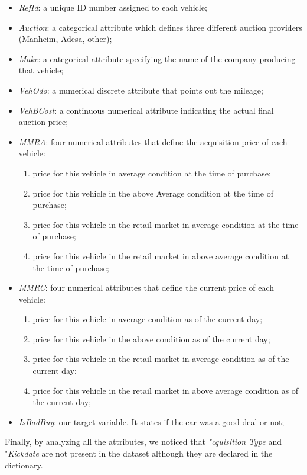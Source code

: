 \documentclass{article}
\begin{document}
	\begin{itemize}
		\item \emph{RefId}: a unique ID number assigned to each vehicle;
		\item \emph{Auction}: a categorical attribute which defines three different auction providers (Manheim, Adesa, other);
		\item \emph{Make}: a categorical attribute specifying the name of the company producing that vehicle;
		\item \emph{VehOdo}: a numerical discrete attribute that points out the mileage;
		\item \emph{VehBCost}: a continuous numerical attribute indicating the actual final auction price;
		\item \emph{MMRA}: four numerical attributes that define the acquisition price of each vehicle:
		\begin{enumerate}
			\item price for this vehicle in average condition at the time of purchase; 
			\item price for this vehicle in the above Average condition at the time of purchase;
			\item price for this vehicle in the retail market in average condition at the time of purchase;
			\item price for this vehicle in the retail market in above average condition at the time of purchase;
		\end{enumerate}
		\item \emph{MMRC}: four numerical attributes that define the current price of each vehicle:
		\begin{enumerate}
			\item price for this vehicle in average condition as of the current day;
			\item price for this vehicle in the above condition as of the current day;
			\item price for this vehicle in the retail market in average condition as of the current day;
			\item price for this vehicle in the retail market in above average condition as of the current day;
		\end{enumerate}
		\item \emph{IsBadBuy}: our target variable. It states if the car was a good deal or not;
	\end{itemize}
	
	Finally, by analyzing all the attributes, we noticed that \emph{"cquisition Type} and "\emph{Kickdate} are not present in the dataset although they are declared in the dictionary.
	
\end{document}
